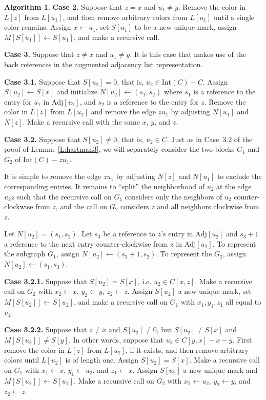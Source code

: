 \documentclass[12pt,letterpaper]{article}
\theoremstyle{plain}
\theoremstyle{definition}
\theoremstyle{break}
\newtheorem{algorithm}[lemma]{Algorithm}     %
\begin{document}
\begin{algorithm}
\textbf{Case 2.} Suppose that $z=x$ and $u_1\ne y$. 
Remove the color in $L[z]$ from $L[u_1]$, and then remove arbitrary
colors from $L[u_1]$ until a single color remains.
Assign $x\leftarrow u_1$,
set $S[u_1]$ to be a new unique mark, assign $M[S[u_1]]\leftarrow S[u_1]$,
and make a recursive call.

\textbf{Case 3.} Suppose that $z\ne x$ and $u_1\ne y$. It is this case that
makes use of the back references in the augmented adjacency list representation.

\textbf{Case 3.1.} Suppose that $S[u_2]=0$, that is, $u_2\in
\text{Int}(C)-C$. Assign $S[u_2]\leftarrow S[x]$ and initialize
$N[u_2]\leftarrow(s_1,s_2)$ where $s_1$ is a reference to the entry
for $u_1$ in $\text{Adj}[u_2]$, and $s_2$ is a reference to the entry
for $z$. Remove the color in $L[z]$ from
$L[u_2]$ and remove the edge $zu_1$ by adjusting
$N[u_1]$ and $N[z]$. Make a recursive call with the same $x$, $y$, and $z$.

\textbf{Case 3.2.} Suppose that $S[u_2]\ne 0$, that is, $u_2\in C$. Just as in
Case~3.2 of the proof of Lemma~\ref{L:hartman3}, we will separately consider
the two blocks $G_1$ and $G_2$ of $\text{Int}(C)-zu_1$.

It is simple to remove the edge $zu_1$ by adjusting $N[z]$ and $N[u_1]$ to
exclude
the corresponding entries. It remains
to ``split'' the
neighborhood of $u_2$ at the edge $u_2z$ such that the recursive call on $G_1$
considers only the neighbors of $u_2$ counter-clockwise from $z$, and the call
on $G_2$ considers $z$ and all neighbors clockwise from $z$.

Let $N[u_2]=(s_1,s_2)$. Let $s_3$ be a reference to $z$'s entry in
$\text{Adj}[u_2]$ and
$s_3+1$ a reference to the next entry counter-clockwise from $z$ in
$\text{Adj}[u_2]$.
To represent
the subgraph $G_1$, assign
$N[u_2]\leftarrow (s_3+1,s_2)$. To represent the $G_2$,
assign $N[u_2]\leftarrow (s_1,s_3)$.

\textbf{Case 3.2.1.} Suppose that $S[u_2]=S[x]$, i.e. $u_2\in C[x,z]$. Make a
recursive call on $G_2$ with $x_2\leftarrow x$,
$y_2\leftarrow y$, $z_2\leftarrow z$. Assign
$S[u_2]$ a new
unique mark, set $M[S[u_2]]\leftarrow S[u_2]$, and make a recursive call
on $G_1$ with $x_1,y_1,z_1$ all equal to $u_2$.

\textbf{Case 3.2.2.} Suppose that $z\ne x$ and $S[u_2]\ne 0$, but
$S[u_2]\ne S[x]$ and $M[S[u_2]]\ne S[y]$. In other words, suppose that
$u_2\in C[y,x]-x-y$.
First remove the color in $L[z]$ from $L[u_2]$, if it exists, and then remove
arbitrary colors until $L[u_2]$ is of length one. Assign $S[u_2]=S[x]$.
Make a recursive call on $G_1$ with $x_1\leftarrow x$,
$y_1\leftarrow u_2$, and $z_1\leftarrow x$.
Assign $S[u_2]$ a new unique mark and $M[S[u_2]]\leftarrow S[u_2]$.
Make a recursive call on $G_2$
with $x_2\leftarrow u_2$, $y_2\leftarrow y$, and $z_2\leftarrow z$.


\end{algorithm}
\end{document}
